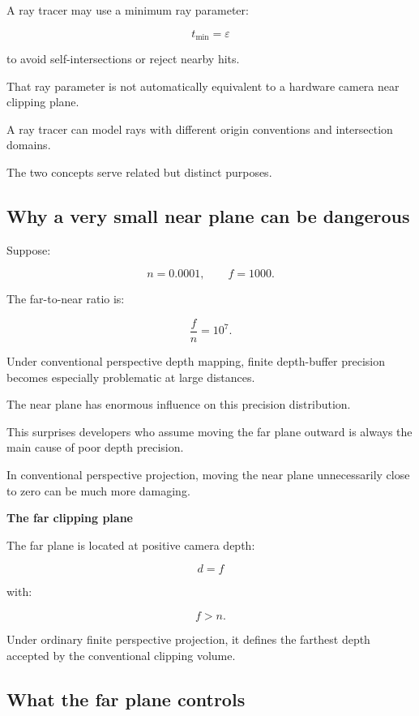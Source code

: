 \hypertarget{02-foundations-ii-ch033-near-clipping-is-not-the-same-as-ray-intersection-epsilon}{}

A ray tracer may use a minimum ray parameter:

\[
 t_{\min}=\varepsilon
\]

to avoid self-intersections or reject nearby hits.

That ray parameter is not automatically equivalent to a hardware camera near clipping plane.

A ray tracer can model rays with different origin conventions and intersection domains.

The two concepts serve related but distinct purposes.

\subsection{Why a very small near plane can be dangerous}\label{02-foundations-ii-ch033-why-a-very-small-near-plane-can-be-dangerous}

\hypertarget{02-foundations-ii-ch033-why-a-very-small-near-plane-can-be-dangerous}{}

Suppose:

\[
 n=0.0001, \qquad f=1000.
\]

The far-to-near ratio is:

\[
 \frac fn=10^7.
\]

Under conventional perspective depth mapping, finite depth-buffer precision becomes especially problematic at large distances.

The near plane has enormous influence on this precision distribution.

This surprises developers who assume moving the far plane outward is always the main cause of poor depth precision.

In conventional perspective projection, moving the near plane unnecessarily close to zero can be much more damaging.

\textbf{The far clipping plane}

The far plane is located at positive camera depth:

\[
 \boxed{d=f}
\]

with:

\[
 f>n.
\]

Under ordinary finite perspective projection, it defines the farthest depth accepted by the conventional clipping volume.

\subsection{What the far plane controls}\label{02-foundations-ii-ch033-what-the-far-plane-controls}


